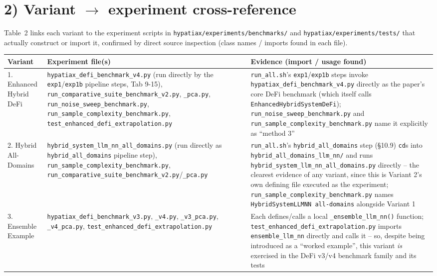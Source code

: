 \documentclass[11pt,a4paper]{article}
\newcommand{\code}[1]{\texttt{\small #1}}
\begin{document}
\newpage
\section{2) Variant $\to$ experiment cross-reference}
Table~2 links each variant to the experiment scripts in
\code{hypatiax/experiments/benchmarks/} and \code{hypatiax/experiments/tests/}
that actually construct or import it, confirmed by direct source
inspection (class names / imports found in each file).

\begin{longtable}{@{}p{2.6cm}p{6.3cm}p{6.3cm}@{}}
\toprule
\textbf{Variant} & \textbf{Experiment file(s)} & \textbf{Evidence (import / usage found)} \\
\midrule
\endhead
1. Enhanced Hybrid DeFi &
  \code{hypatiax\_defi\_benchmark\_v4.py} (run directly by the \code{exp1}/\code{exp1b} pipeline steps, Tab 9-15), \code{run\_comparative\_suite\_benchmark\_v2.py}, \code{\_pca.py}, \code{run\_noise\_sweep\_benchmark.py}, \code{run\_sample\_complexity\_benchmark.py}, \code{test\_enhanced\_defi\_extrapolation.py} &
  \code{run\_all.sh}'s \code{exp1}/\code{exp1b} steps invoke \code{hypatiax\_defi\_benchmark\_v4.py} directly as the paper's core DeFi benchmark (which itself calls \code{EnhancedHybridSystemDeFi}); \code{run\_noise\_sweep\_benchmark.py} and \code{run\_sample\_complexity\_benchmark.py} name it explicitly as ``method 3'' \\
\midrule
2. Hybrid All-Domains &
  \code{hybrid\_system\_llm\_nn\_all\_domains.py} (run directly as \code{hybrid\_all\_domains} pipeline step), \code{run\_sample\_complexity\_benchmark.py}, \code{run\_comparative\_suite\_benchmark\_v2.py}/\code{\_pca.py} &
  \code{run\_all.sh}'s \code{hybrid\_all\_domains} step (\S10.9) \code{cd}s into \code{hybrid\_all\_domains\_llm\_nn/} and runs \code{hybrid\_system\_llm\_nn\_all\_domains.py} directly -- the clearest evidence of any variant, since this is Variant 2's own defining file executed as the experiment; \code{run\_sample\_complexity\_benchmark.py} names \code{HybridSystemLLMNN all-domains} alongside Variant 1 \\
\midrule
3. Ensemble Example &
  \code{hypatiax\_defi\_benchmark\_v3.py}, \code{\_v4.py}, \code{\_v3\_pca.py}, \code{\_v4\_pca.py}, \code{test\_enhanced\_defi\_extrapolation.py} &
  Each defines/calls a local \code{\_ensemble\_llm\_nn()} function; \code{test\_enhanced\_defi\_extrapolation.py} imports \code{ensemble\_llm\_nn} directly and calls it -- so, despite being introduced as a ``worked example'', this variant \emph{is} exercised in the DeFi v3/v4 benchmark family and its tests \\

\end{longtable}
\end{document}
